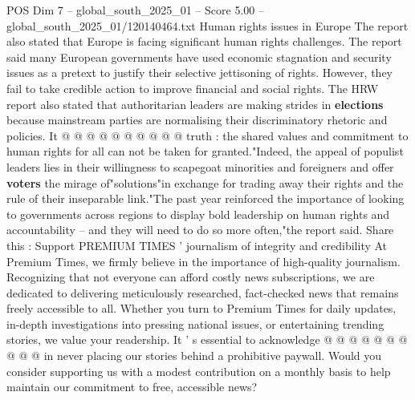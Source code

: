 \begin{textsample}{POS Dim 7 – global\_south\_2025\_01 – Score 5.00 – global\_south\_2025\_01/120140464.txt}
Human rights issues in Europe The report also stated that Europe is facing significant human rights challenges.
The report said many European governments have used economic stagnation and security issues as a pretext to justify their selective jettisoning of rights.
However, they fail to take credible action to improve financial and social rights.
The HRW report also stated that authoritarian leaders are making strides in \textbf{elections} because mainstream parties are normalising their discriminatory rhetoric and policies.
It @ @ @ @ @ @ @ @ @ @ truth : the shared values and commitment to human rights for all can not be taken for granted."Indeed, the appeal of populist leaders lies in their willingness to scapegoat minorities and foreigners and offer \textbf{voters} the mirage of"solutions"in exchange for trading away their rights and the rule of their inseparable link."The past year reinforced the importance of looking to governments across regions to display bold leadership on human rights and accountability -- and they will need to do so more often,"the report said.
Share this : Support PREMIUM TIMES ' journalism of integrity and credibility At Premium Times, we firmly believe in the importance of high-quality journalism.
Recognizing that not everyone can afford costly news subscriptions, we are dedicated to delivering meticulously researched, fact-checked news that remains freely accessible to all.
Whether you turn to Premium Times for daily updates, in-depth investigations into pressing national issues, or entertaining trending stories, we value your readership.
It ' s essential to acknowledge @ @ @ @ @ @ @ @ @ @ in never placing our stories behind a prohibitive paywall.
Would you consider supporting us with a modest contribution on a monthly basis to help maintain our commitment to free, accessible news?

\end{textsample}
